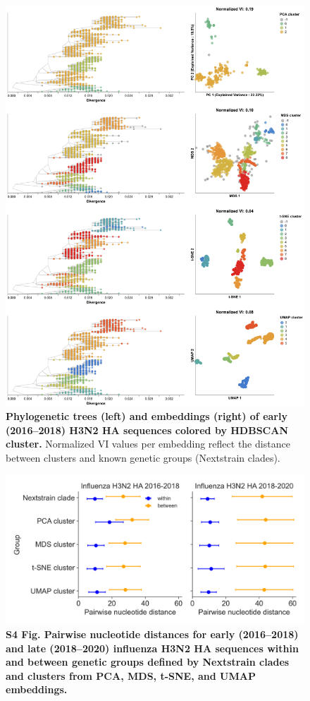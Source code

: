 \documentclass[10pt,letterpaper]{article}
\begin{document}
\begin{figure}[!h]
\includegraphics[width=\columnwidth]{figures/flu-2016-2018-ha-embeddings-by-cluster.png}
\caption{{\bf Phylogenetic trees (left) and embeddings (right) of early (2016--2018) H3N2 HA sequences colored by HDBSCAN cluster.}
Normalized VI values per embedding reflect the distance between clusters and known genetic groups (Nextstrain clades).}
\label{fig:seasonal-influenza-h3n2-ha-2016-2018-clusters}
\end{figure}

\begin{figure}[!h]
\includegraphics[width=\columnwidth]{figures/within_between_influenza.png}
\caption*{{\bf S4 Fig. Pairwise nucleotide distances for early (2016--2018) and late (2018--2020) influenza H3N2 HA sequences within and between genetic groups defined by Nextstrain clades and clusters from PCA, MDS, t-SNE, and UMAP embeddings.}}
\end{figure}
\end{document}
